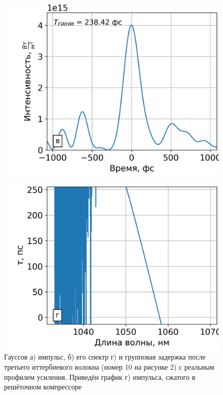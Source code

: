 \documentclass[12pt]{article}
\begin{document}
\begin{figure}[h!]
\begin{minipage}[b]{0.5\textwidth}
  \end{minipage}

  \vspace{}

  \begin{minipage}[b]{0.5\textwidth}
    \includegraphics[width=\linewidth]{Images/Gauss Pulse x10/23 элемент gamma=60.88315 l_g=0.73684 сжатие}
  \end{minipage}%
  \begin{minipage}[b]{0.5\textwidth}
    \includegraphics[width=\linewidth]{Images/Gauss Pulse x10/!23. Fiber_time_delay}
  \end{minipage}

  \caption{Гауссов а) импульс, б) его спектр г) и групповая задержка после третьего иттербиевого волокна (номер 10 на
  рисунке 2) с реальным профилем усиления. Приведён график г) импульса, сжатого в решёточном компрессоре}
  \label{fig:both}
\end{figure}
\end{document}

